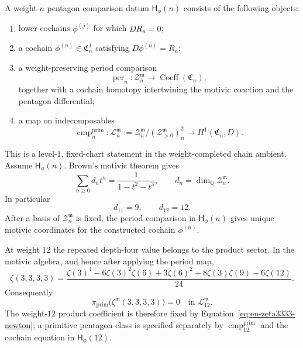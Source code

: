 \begin{definition}
\label{def:phi-n-comparison-datum}
A weight-$n$ pentagon comparison datum $\mathsf H_{\phi}(n)$ consists of
the following objects:
\begin{enumerate}[label=\textup{(\roman*)}]
\item lower cochains $\phi^{(j)}$ for which $DR_n=0$;
\item a cochain $\phi^{(n)}\in\mathfrak C^1_n$ satisfying
$D\phi^{(n)}=R_n$;
\item a weight-preserving period comparison
\[
 \operatorname{per}_n:\mathcal Z^{\mathfrak m}_n
 \longrightarrow\operatorname{Coeff}(\mathfrak C_n),
\]
together with a cochain homotopy intertwining the motivic coaction and
the pentagon differential;
\item a map on indecomposables
\[
 \operatorname{cmp}^{\mathrm{prim}}_n:
 \mathcal L^{\mathfrak m}_n
 :=\mathcal Z^{\mathfrak m}_n/
   (\mathcal Z^{\mathfrak m}_{>0})^2_n
 \longrightarrow H^1(\mathfrak C_n,D).
\]
\end{enumerate}
\end{definition}

\begin{theorem}
\label{thm:phi-n-conditionality}
This is a level-$1$, fixed-chart statement in the weight-completed
chain ambient.  Assume $\mathsf H_{\phi}(n)$.  Brown's motivic theorem gives
\[
 \sum_{n\geq0}d_nt^n=\frac1{1-t^2-t^3},
 \qquad d_n=\dim_{\mathbb Q}\mathcal Z^{\mathfrak m}_n.
\]
In particular
\[
 d_{11}=9,\qquad d_{12}=12.
\]
After a basis of $\mathcal Z^{\mathfrak m}_n$ is fixed, the period
comparison in $\mathsf H_{\phi}(n)$ gives unique motivic coordinates
for the constructed cochain $\phi^{(n)}$.

At weight $12$ the repeated depth-four value belongs to the product
sector.  In the motivic algebra, and hence after applying the period
map,
\begin{equation}\label{eq:en-zeta3333-newton}
 \zeta(3,3,3,3)
 =\frac{\zeta(3)^4-6\zeta(3)^2\zeta(6)+3\zeta(6)^2
 +8\zeta(3)\zeta(9)-6\zeta(12)}{24}.
\end{equation}
Consequently
\[
 \pi_{\mathrm{prim}}\bigl(\zeta^{\mathfrak m}(3,3,3,3)\bigr)=0
 \quad\text{in }\mathcal L^{\mathfrak m}_{12}.
\]
The weight-$12$ product coefficient is therefore fixed by
Equation~\eqref{eq:en-zeta3333-newton}; a primitive pentagon class is
specified separately by
$\operatorname{cmp}^{\mathrm{prim}}_{12}$ and the cochain equation in
$\mathsf H_{\phi}(12)$.
\end{theorem}

